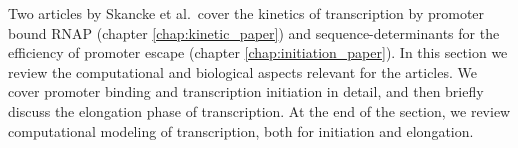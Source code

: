 %
Two articles by Skancke et al.\ cover the kinetics of transcription by promoter
bound RNAP (chapter \ref{chap:kinetic_paper}) and sequence-determinants for the
efficiency of promoter escape (chapter \ref{chap:initiation_paper}). In this
section we review the computational and biological aspects relevant for the
articles. We cover promoter binding and transcription initiation in detail, and
then briefly discuss the elongation phase of transcription. At the end of the
section, we review computational modeling of transcription, both for initiation
and elongation.
